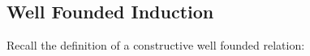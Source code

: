 \begin{code}[hide]
\AgdaSpace{}%
\AgdaSpace{}%
\AgdaSpace{}%
\AgdaSpace{}%
\AgdaSpace{}%
\AgdaSpace{}%
\AgdaSpace{}%
\AgdaSpace{}%
\AgdaSpace{}%
\<%
\\
%
\>[4]\AgdaSpace{}%
\AgdaSymbol{(}\AgdaSpace{}%
\AgdaSymbol{)}\AgdaSpace{}%
\AgdaSymbol{=}\AgdaSpace{}%
\<%
\\
%
\\[\AgdaEmptyExtraSkip]%
%
\>[4]\AgdaSpace{}%
\AgdaSpace{}%
\<%
\end{code}

\subsection{Well Founded Induction}
\label{subsec:wf}
Recall the definition of a constructive well founded relation:




